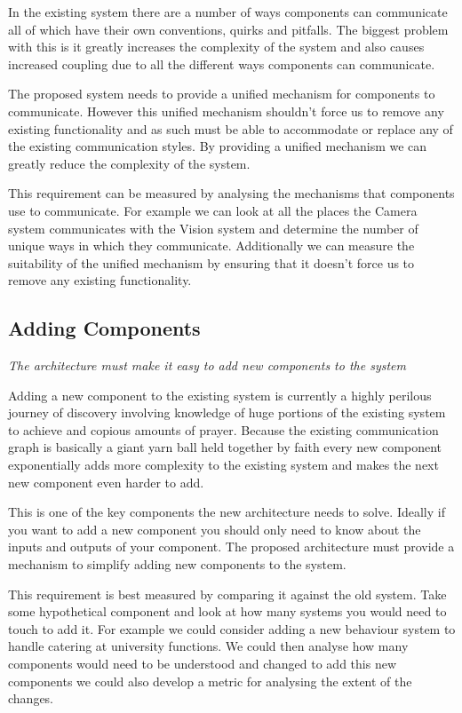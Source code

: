 \documentclass[english,12pt]{scrartcl}
\newcommand{\requirement}[1]{\textit{#1}}
\begin{document}
			In the existing system there are a number of ways components can communicate all of
			which have their own conventions, quirks and pitfalls. The biggest problem with this is
			it greatly increases the complexity of the system and also causes increased coupling due
			to all the different ways components can communicate.

			The proposed system needs to provide a unified mechanism for components to communicate.
			However this unified mechanism shouldn't force us to remove any existing functionality
			and as such must be able to accommodate or replace any of the existing communication
			styles. By providing a unified mechanism we can greatly reduce the complexity of the
			system.

			This requirement can be measured by analysing the mechanisms that components use to
			communicate. For example we can look at all the places the Camera system communicates
			with the Vision system and determine the number of unique ways in which they
			communicate. Additionally we can measure the suitability of the unified mechanism by
			ensuring that it doesn't force us to remove any existing functionality.

		\subsection{Adding Components}
			\requirement{The architecture must make it easy to add new components to the system}

			Adding a new component to the existing system is currently a highly perilous journey of
			discovery involving knowledge of huge portions of the existing system to achieve and
			copious amounts of prayer. Because the existing communication graph is basically a giant
			yarn ball held together by faith every new component exponentially adds more complexity
			to the existing system and makes the next new component even harder to add.

			This is one of the key components the new architecture needs to solve. Ideally if you
			want to add a new component you should only need to know about the inputs and outputs of
			your component. The proposed architecture must provide a mechanism to simplify adding
			new components to the system.

			This requirement is best measured by comparing it against the old system. Take some
			hypothetical component and look at how many systems you would need to touch to add it.
			For example we could consider adding a new behaviour system to handle catering at
			university functions. We could then analyse how many components would need to be
			understood and changed to add this new components we could also develop a metric for
			analysing the extent of the changes.
\end{document}
